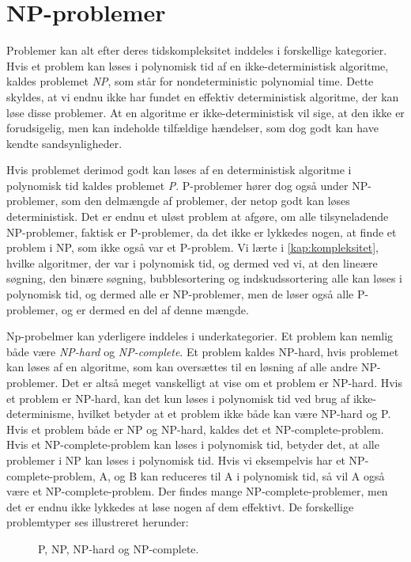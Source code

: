 \section{NP-problemer} \label{kap:np}
Problemer kan alt efter deres tidskompleksitet inddeles i forskellige kategorier. Hvis et problem kan løses i polynomisk tid af en ikke-deterministisk algoritme, kaldes problemet \emph{NP}, som står for nondeterministic polynomial time. Dette skyldes, at vi endnu ikke har fundet en effektiv deterministisk algoritme, der kan løse disse problemer. At en algoritme er ikke-deterministisk vil sige, at den ikke er forudsigelig, men kan indeholde tilfældige hændelser, som dog godt kan have kendte sandsynligheder. 


Hvis problemet derimod godt kan løses af en deterministisk algoritme i polynomisk tid kaldes problemet \emph{P}. P-problemer hører dog også under NP-problemer, som den delmængde af problemer, der netop godt kan løses deterministisk. Det er endnu et uløst problem at afgøre, om alle tilsyneladende NP-problemer, faktisk er P-problemer, da det ikke er lykkedes nogen, at finde et problem i NP, som ikke også var et P-problem. Vi lærte i \autoref{kap:kompleksitet}, hvilke algoritmer, der var i polynomisk tid, og dermed ved vi, at den lineære søgning, den binære søgning, bubblesortering og indskudssortering alle kan løses i polynomisk tid, og dermed alle er NP-problemer, men de løser også alle P-problemer, og er dermed en del af denne mængde.

Np-probelmer kan yderligere inddeles i underkategorier. Et problem kan nemlig både være \emph{NP-hard} og \emph{NP-complete}. Et problem kaldes NP-hard, hvis problemet kan løses af en algoritme, som kan oversættes til en løsning af alle andre NP-problemer. Det er altså meget vanskelligt at vise om et problem er NP-hard. Hvis et problem er NP-hard, kan det kun løses i polynomisk tid ved brug af ikke-determinisme, hvilket betyder at et problem ikke både kan være NP-hard og P.
Hvis et problem både er NP og NP-hard, kaldes det et NP-complete-problem. Hvis et NP-complete-problem kan løses i polynomisk tid, betyder det, at alle problemer i NP kan løses i polynomisk tid. Hvis vi eksempelvis har et NP-complete-problem, A, og B kan reduceres til A i polynomisk tid, så vil A også være et NP-complete-problem. Der findes mange NP-complete-problemer, men det er endnu ikke lykkedes at løse nogen af dem effektivt. De forskellige problemtyper ses illustreret herunder:

\begin{figure}[H]
\centering
	\caption{P, NP, NP-hard og NP-complete.}
	\label{fig.dijkstraexmp}
\end{figure}

